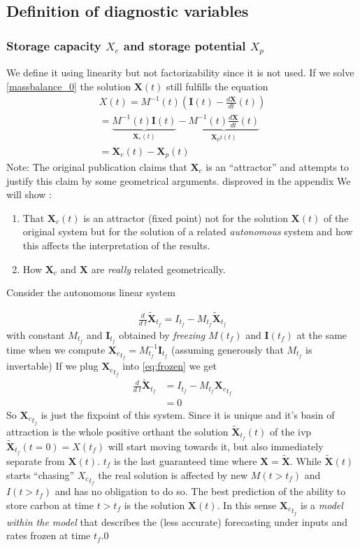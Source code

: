 \documentclass[journal abbreviation, manuscript]{copernicus}
\theoremstyle{definition}
\newcommand{\X}{\mathbf{X}}
\newcommand{\I}{\mathbf{I}}
\begin{document}
\subsection{Definition of diagnostic variables}

\subsubsection{Storage capacity $X_c$ and storage potential $X_p$}
\label{XcDef}
We define it using linearity but not factorizability since it is not used.
If we solve \eqref{massbalance_0} the solution $\X(t)$ still fulfills the equation 
\begin{align}
X(t) = M^{-1}(t) \left(\I(t)- \frac{d \X}{d t} (t)\right) \\ 
  = \underbrace{M^{-1}(t)\I(t)}_{\X_c(t)} - \underbrace{M^{-1}(t) \frac{d \X}{d t} (t)}_{\X_pi(t)} \\
  = \X_c(t) - \X_p(t)
\end{align}
Note:
The original publication \citep[p. 150 after eq.8b ]{Luo2017Biogeosciences} claims that $\X_c$ is an ``attractor'' and attempts to justify this claim by some geometrical arguments. {\color{red} disproved in the appendix}
We will show : 
\begin{enumerate}
\item \label{frozen}
  That $\X_c(t)$ is an attractor (fixed point)  not for the solution $\X(t)$ of the original system but for the solution of a related \emph{autonomous} system and how this affects the interpretation of the results.
\item
  How $\X_c$ and $\X$ are \emph{really} related geometrically.
\end{enumerate}
Consider the autonomous linear system 

\begin{align}
  \frac{d}{d\;t}\tilde{\X}_{t_f} = I_{t_f} - M_{t_f} \tilde{\X}_{t_f}
  \label{eq:frozen}
\end{align}
with constant $M_{t_f}$ and $\I_{t_f}$  obtained
by \emph{freezing} $M(t_f)$ and $\I(t_f)$ at the same time when we compute ${\X_c}_{t_f}=M^{-1}_{t_f}\I_{t_f}$ (assuming generously that $M_{t_f}$ is invertable)
If we plug ${\X_c}_{t_f}$ into \eqref{eq:frozen} we get 
\begin{align*}
  \frac{d}{d\;t}\tilde{\X}_{t_f} &= I_{t_f} - M_{t_f} {\X_c}_{t_f} \\
                            &= 0
\end{align*}
So ${\X_c}_{t_f}$ is just the fixpoint of this system. 
Since it is unique and it's basin of attraction is the whole positive orthant the solution $\tilde{\X}_{t_f}(t)$ of the ivp $\tilde{\X}_{t_f}(t=0)=X(t_f)$ will start moving towards it, but also immediately separate from $\X(t)$.  
$t_f$  is the last guaranteed time where $\X = \tilde{\X}$.
While $\tilde{\X}(t)$ starts ``chasing'' ${X_c}_{t_f}$ the real solution is affected by new $M(t>t_f)$ and $I(t>t_f)$ and has no obligation to do so.  
The best prediction of the ability to store carbon at time $t>t_f$ is the solution $\X(t)$. In this sense ${\X_c}_{t_f}$ is a \emph{model within the model} that describes the (less accurate) forecasting under inputs and rates frozen at time $t_f$.0 
\end{document}
